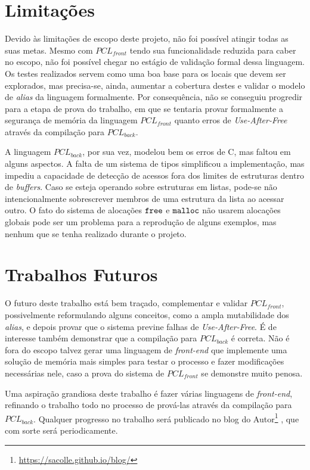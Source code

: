 \section{Limitações}

Devido às limitações de escopo deste projeto, não foi possível atingir todas as suas metas. Mesmo com $PCL_{front}$ tendo sua funcionalidade reduzida para caber no escopo, não foi possível chegar no estágio de validação formal dessa linguagem. Os testes realizados servem como uma boa base para os locais que devem ser explorados, mas precisa-se, ainda, aumentar a cobertura destes e validar o modelo de \emph{alias} da linguagem formalmente. Por consequência, não se conseguiu progredir para a etapa de prova do trabalho, em que se tentaria provar formalmente a segurança de memória da linguagem $PCL_{front}$ quanto erros de \emph{Use-After-Free} através da compilação para $PCL_{back}$.

A linguagem $PCL_{back}$, por sua vez, modelou bem os erros de C, mas faltou em alguns aspectos. A falta de um sistema de tipos simplificou a implementação, mas impediu a capacidade de detecção de acessos fora dos limites de estruturas dentro de \emph{buffers}. Caso se esteja operando sobre estruturas em listas, pode-se não intencionalmente sobrescrever membros de uma estrutura da lista ao acessar outro. O fato do sistema de alocações $\texttt{free}$ e $\texttt{malloc}$ não usarem alocações globais pode ser um problema para a reprodução de alguns exemplos, mas nenhum que se tenha realizado durante o projeto.

\section{Trabalhos Futuros}

O futuro deste trabalho está bem traçado, complementar e validar $PCL_{front}$, possivelmente reformulando alguns conceitos, como a ampla mutabilidade dos \emph{alias}, e depois provar que o sistema previne falhas de \emph{Use-After-Free}. É de interesse também demonstrar que a compilação para $PCL_{back}$ é correta. Não é fora do escopo talvez gerar uma linguagem de \emph{front-end} que implemente uma solução de memória mais simples para testar o processo e fazer modificações necessárias nele, caso a prova do sistema de $PCL_{front}$ se demonstre muito penosa.

Uma aspiração grandiosa deste trabalho é fazer várias linguagens de \emph{front-end}, refinando o trabalho todo no processo de prová-las através da compilação para $PCL_{back}$. Qualquer progresso no trabalho será publicado no blog do Autor\footnote{\url{https://sacolle.github.io/blog/}} , que com sorte será periodicamente. 